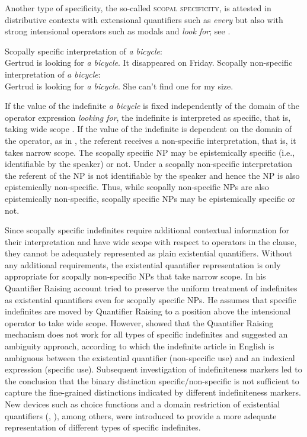 \documentclass[output=paper,colorlinks,citecolor=brown]{langscibook}
\begin{document}
Another type of specificity, the so-called \textsc{scopal specificity}, is attested in distributive contexts with extensional quantifiers such as \textit{every} but also with strong intensional operators such as modals and \textit{look for}; see .

\ea\label{geist:ex:scopal-spec-bicycle}\ea Scopally specific interpretation of \textit{a bicycle}:\\
Gertrud is looking for \textit{a bicycle}. It disappeared on Friday.\label{geist:ex:scopal-spec-bicycle-a}
\ex Scopally non-specific interpretation of \textit{a bicycle}:\\
Gertrud is looking for \textit{a bicycle}. She can’t find one for my size.\label{geist:ex:scopal-spec-bicycle-b}
\z\z

\noindent If the value of the indefinite \textit{a bicycle} is fixed independently of the domain of the operator expression \textit{looking for}, the indefinite is interpreted as specific, that is, taking wide scope . If the value of the indefinite is dependent on the domain of the operator, as in , the referent receives a non-specific interpretation, that is, it takes narrow scope. The scopally specific NP may be epistemically specific (i.e., identifiable by the speaker) or not. Under a scopally non-specific interpretation the referent of the NP is not identifiable by the speaker and hence the NP is also epistemically non-specific. Thus, while scopally non-specific NPs are also epistemically non-specific, scopally specific NPs may be epistemically specific or not.

\largerpage
Since scopally specific indefinites require additional contextual information for their interpretation and have wide scope with respect to operators in the clause, they cannot be adequately represented as plain existential quantifiers. Without any additional requirements, the existential quantifier representation is only appropriate for scopally non-specific NPs that take narrow scope. In his Quantifier Raising account \citet{May1977} tried to preserve the uniform treatment of indefinites as existential quantifiers even for scopally specific NPs. He assumes that specific indefinites are moved by Quantifier Raising to a position above the intensional operator to take wide scope. However, \citet{Fodor.Sag1982} showed that the Quantifier Raising mechanism does not work for all types of specific indefinites and suggested an ambiguity approach, according to which the indefinite article in English is ambiguous between the existential quantifier (non-specific use) and an indexical expression (specific use). Subsequent investigation of indefiniteness markers led to the conclusion that the binary distinction specific/non-specific is not sufficient to capture the fine-grained distinctions indicated by different indefiniteness markers. New devices such as choice functions \citep{Winter1997,Kratzer1998} and a domain restriction of existential quantifiers (\citealt{Portner2002}, \citealt{Schwarzschild2002a}), among others, were introduced to provide a more adequate representation of different types of specific indefinites. 
\end{document}
